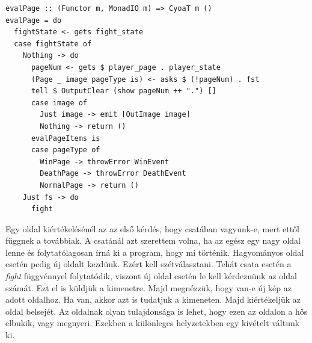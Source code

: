 \documentclass[12pt,a4paper,oneside]{report}
\begin{document}
  \begin{verbatim}
evalPage :: (Functor m, MonadIO m) => CyoaT m ()
evalPage = do
  fightState <- gets fight_state
  case fightState of
    Nothing -> do
      pageNum <- gets $ player_page . player_state
      (Page _ image pageType is) <- asks $ (!pageNum) . fst
      tell $ OutputClear (show pageNum ++ ".") []
      case image of
        Just image -> emit [OutImage image]
        Nothing -> return ()
      evalPageItems is
      case pageType of
        WinPage -> throwError WinEvent
        DeathPage -> throwError DeathEvent
        NormalPage -> return ()
    Just fs -> do
      fight
  \end{verbatim}
  Egy oldal kiértékelésénél az az első kérdés, hogy csatában
  vagyunk-e, mert ettől függnek a továbbiak. A csatánál azt szerettem
  volna, ha az egész egy nagy oldal lenne és folytatólagosan írná ki a
  program, hogy mi történik. Hagyományos oldal esetén pedig új oldalt
  kezdünk. Ezért kell szétválasztani. Tehát csata
  esetén a \emph{fight} függvénnyel folytatódik, viszont új oldal esetén le
  kell kérdeznünk az oldal számát. Ezt el is küldjük a kimenetre. Majd
  megnézzük, hogy van-e új kép az adott oldalhoz. Ha van, akkor azt is
  tudatjuk a kimeneten. Majd kiértékeljük az oldal belsejét. Az
  oldalnak olyan tulajdonsága is lehet, hogy ezen az oldalon a hős
  elbukik, vagy megnyeri. Ezekben a különleges helyzetekben egy
  kivételt váltunk ki.
\end{document}
